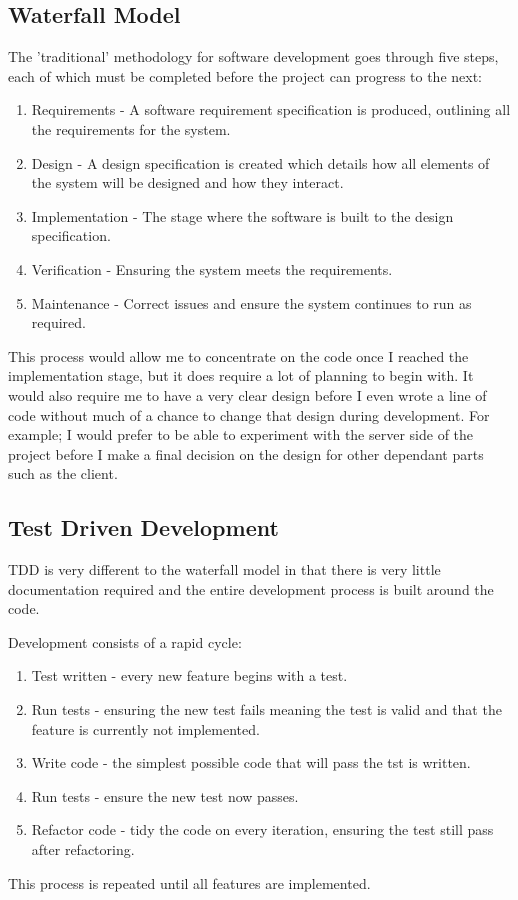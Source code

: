 \documentclass[a4papert,11pt,notitlepage]{ltxdoc}
\begin{document}
\subsection{Waterfall Model}
The 'traditional' methodology for software development goes through five steps, each of which must be completed before the project can progress to the next:
\begin{enumerate}
\item Requirements - A software requirement specification is produced, outlining all the requirements for the system.
\item Design - A design specification is created which details how all elements of the system will be designed and how they interact.
\item Implementation - The stage where the software is built to the design specification.
\item Verification - Ensuring the system meets the requirements.
\item Maintenance - Correct issues and ensure the system continues to run as required.
\end{enumerate}

This process would allow me to concentrate on the code once I reached the implementation stage, but it does require a lot of planning to begin with. It would also require me to have a very clear design before I even wrote a line of code without much of a chance to change that design during development. For example; I would prefer to be able to experiment with the server side of the project before I make a final decision on the design for other dependant parts such as the client.

\subsection{Test Driven Development}
TDD is very different to the waterfall model in that there is very little documentation required and the entire development process is built around the code.

Development consists of a rapid cycle:
\begin{enumerate}
\item Test written - every new feature begins with a test.
\item Run tests - ensuring the new test fails meaning the test is valid and that the feature is currently not implemented.
\item Write code - the simplest possible code that will pass the tst is written.
\item Run tests - ensure the new test now passes.
\item Refactor code - tidy the code on every iteration, ensuring the test still pass after refactoring.
\end{enumerate}
This process is repeated until all features are implemented.
\end{document}
